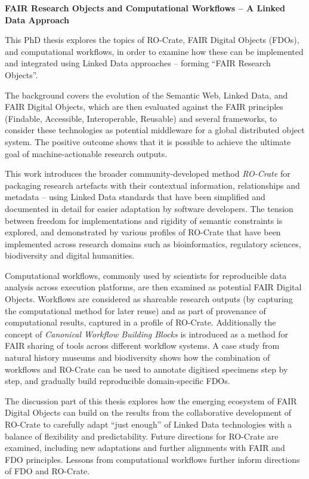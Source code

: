 \textbf{FAIR Research Objects and Computational Workflows – A Linked Data Approach}

\begin{small}

This PhD thesis explores the topics of RO-Crate, FAIR Digital Objects (FDOs), and computational workflows, in order to examine how these can be implemented and integrated using Linked Data approaches -- forming ``FAIR Research Objects''.

The background covers the evolution of the Semantic Web, Linked Data, and FAIR Digital Objects, which are then evaluated against the FAIR principles (Findable, Accessible, Interoperable, Reusable) and several frameworks, to consider these technologies as potential middleware for a global distributed object system. The positive outcome shows that it is possible to achieve the ultimate goal of machine-actionable research outputs.

This work introduces the broader community-developed method \emph{RO-Crate} for packaging research artefacts with their contextual information, relationships and metadata -- using Linked Data standards that have been simplified and documented in detail for easier adaptation by software developers. The tension between freedom for implementations and rigidity of semantic constraints is explored, and demonstrated by various profiles of RO-Crate that have been implemented across research domains such as bioinformatics, regulatory sciences, biodiversity and digital humanities.

Computational workflows, commonly used by scientists for reproducible data analysis across execution platforms, are then examined as potential FAIR Digital Objects. Workflows are considered as shareable research outputs (by capturing the computational method for later reuse) and as part of provenance of computational results, captured in a profile of RO-Crate. Additionally the concept of \emph{Canonical Workflow Building Blocks} is introduced as a method for FAIR sharing of tools across different workflow systems. A case study from natural history museums and biodiversity shows how the combination of workflows and RO-Crate can be used to annotate digitised specimens step by step, and gradually build reproducible domain-specific FDOs.

The discussion part of this thesis explores how the emerging ecosystem of FAIR Digital Objects can build on the results from the collaborative development of RO-Crate to carefully adapt ``just enough'' of Linked Data technologies with a balance of flexibility and predictability. Future directions for RO-Crate are examined, including new adaptations and further alignments with FAIR and FDO principles. Lessons from computational workflows further inform directions of FDO and RO-Crate. 


\end{small}

